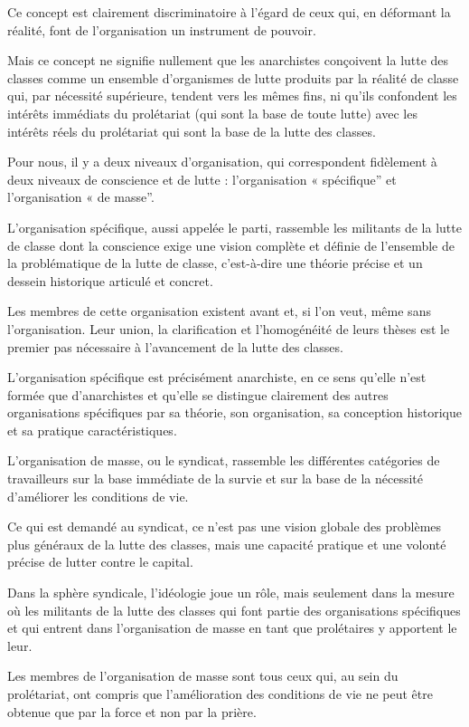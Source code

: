 Ce concept est clairement discriminatoire à l'égard de ceux qui, en déformant la réalité, font de l'organisation un instrument de pouvoir.

Mais ce concept ne signifie nullement que les anarchistes conçoivent la lutte des classes comme un ensemble d'organismes de lutte produits par la réalité de classe qui, par nécessité supérieure, tendent vers les mêmes fins, ni qu'ils confondent les intérêts immédiats du prolétariat (qui sont la base de toute lutte) avec les intérêts réels du prolétariat qui sont la base de la lutte des classes.

Pour nous, il y a deux niveaux d'organisation, qui correspondent fidèlement à deux niveaux de conscience et de lutte : l'organisation « spécifique'' et l'organisation « de masse''.

L'organisation spécifique, aussi appelée le parti, rassemble les militants de la lutte de classe dont la conscience exige une vision complète et définie de l'ensemble de la problématique de la lutte de classe, c'est-à-dire une théorie précise et un dessein historique articulé et concret.

Les membres de cette organisation existent avant et, si l'on veut, même sans l'organisation. Leur union, la clarification et l'homogénéité de leurs thèses est le premier pas nécessaire à l'avancement de la lutte des classes.

L'organisation spécifique  est précisément anarchiste, en ce sens qu'elle n'est formée que d'anarchistes et qu'elle se distingue clairement des autres organisations spécifiques  par sa théorie, son organisation, sa conception historique et sa pratique caractéristiques.

L'organisation de masse, ou le syndicat, rassemble les différentes catégories de travailleurs sur la base immédiate de la survie et sur la base de la nécessité d'améliorer les conditions de vie.

Ce qui est demandé au syndicat, ce n'est pas une vision globale des problèmes plus généraux de la lutte des classes, mais une capacité pratique et une volonté précise de lutter contre le capital.

Dans la sphère syndicale, l'idéologie joue un rôle, mais seulement dans la mesure où les militants de la lutte des classes qui font partie des organisations spécifiques et qui entrent dans l'organisation de masse en tant que prolétaires y apportent le leur.

Les membres de l'organisation de masse sont tous ceux qui, au sein du prolétariat, ont compris que l'amélioration des conditions de vie ne peut être obtenue que par la force et non par la prière.

